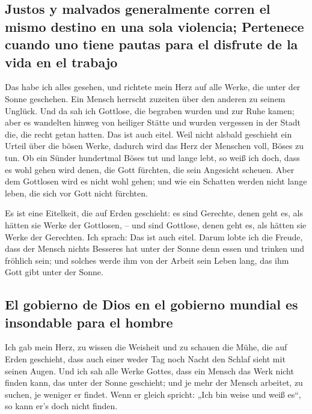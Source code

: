\hypertarget{justos-y-malvados-generalmente-corren-el-mismo-destino-en-una-sola-violencia-pertenece-cuando-uno-tiene-pautas-para-el-disfrute-de-la-vida-en-el-trabajo}{%
\subsection{Justos y malvados generalmente corren el mismo destino en
una sola violencia; Pertenece cuando uno tiene pautas para el disfrute
de la vida en el
trabajo}\label{justos-y-malvados-generalmente-corren-el-mismo-destino-en-una-sola-violencia-pertenece-cuando-uno-tiene-pautas-para-el-disfrute-de-la-vida-en-el-trabajo}}

 Das habe ich alles gesehen, und richtete mein Herz auf
alle Werke, die unter der Sonne geschehen. Ein Mensch herrscht zuzeiten
über den anderen zu seinem Unglück.  Und da sah ich
Gottlose, die begraben wurden und zur Ruhe kamen; aber es wandelten
hinweg von heiliger Stätte und wurden vergessen in der Stadt die, die
recht getan hatten. Das ist auch eitel.  Weil nicht
alsbald geschieht ein Urteil über die bösen Werke, dadurch wird das Herz
der Menschen voll, Böses zu tun.  Ob ein Sünder
hundertmal Böses tut und lange lebt, so weiß ich doch, dass es wohl
gehen wird denen, die Gott fürchten, die sein Angesicht scheuen.
 Aber dem Gottlosen wird es nicht wohl gehen; und wie ein
Schatten werden nicht lange leben, die sich vor Gott nicht fürchten.

 Es ist eine Eitelkeit, die auf Erden geschieht: es sind
Gerechte, denen geht es, als hätten sie Werke der Gottlosen, -- und sind
Gottlose, denen geht es, als hätten sie Werke der Gerechten. Ich sprach:
Das ist auch eitel.  Darum lobte ich die Freude, dass der
Mensch nichts Besseres hat unter der Sonne denn essen und trinken und
fröhlich sein; und solches werde ihm von der Arbeit sein Leben lang, das
ihm Gott gibt unter der Sonne.

\hypertarget{el-gobierno-de-dios-en-el-gobierno-mundial-es-insondable-para-el-hombre}{%
\subsection{El gobierno de Dios en el gobierno mundial es insondable
para el
hombre}\label{el-gobierno-de-dios-en-el-gobierno-mundial-es-insondable-para-el-hombre}}

 Ich gab mein Herz, zu wissen die Weisheit und zu schauen
die Mühe, die auf Erden geschieht, dass auch einer weder Tag noch Nacht
den Schlaf sieht mit seinen Augen.  Und ich sah alle
Werke Gottes, dass ein Mensch das Werk nicht finden kann, das unter der
Sonne geschieht; und je mehr der Mensch arbeitet, zu suchen, je weniger
er findet. Wenn er gleich spricht: „Ich bin weise und weiß es``, so kann
er's doch nicht finden.

